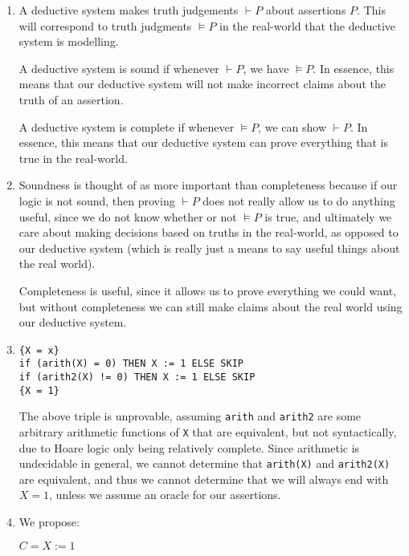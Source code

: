 


\begin{enumerate}[label=(\alph*)]

  \item
    A deductive system makes truth judgements $\vdash P$ about assertions $P$. This will correspond to truth judgments $\vDash P$ in the real-world that the deductive system is modelling.

    A deductive system is sound if whenever $\vdash P$, we have $\vDash P$. In essence, this means that our deductive system will not make incorrect claims about the truth of an assertion.

    A deductive system is complete if whenever $\vDash P$, we can show $\vdash P$. In essence, this means that our deductive system can prove everything that is true in the real-world.

    \item
      Soundness is thought of as more important than completeness because if our logic is not sound, then proving $\vdash P$ does not really allow us to do anything useful, since we do not know whether or not $\vDash P$ is true, and ultimately we care about making decisions based on truths in the real-world, as opposed to our deductive system (which is really just a means to say useful things about the real world).

      Completeness is useful, since it allows us to prove everything we could want, but without completeness we can still make claims about the real world using our deductive system.

      \item
\begin{verbatim}
{X = x}
if (arith(X) = 0) THEN X := 1 ELSE SKIP
if (arith2(X) != 0) THEN X := 1 ELSE SKIP
{X = 1}
\end{verbatim}

The above triple is unprovable, assuming \texttt{arith} and \texttt{arith2} are some arbitrary arithmetic functions of \texttt{X} that are equivalent, but not syntactically, due to Hoare logic only being relatively complete. Since arithmetic is undecidable in general, we cannot determine that \texttt{arith(X)} and \texttt{arith2(X)} are equivalent, and thus we cannot determine that we will always end with $X=1$, unless we assume an oracle for our assertions.

\item
  We propose:

  $C = X := 1$


\end{enumerate}
